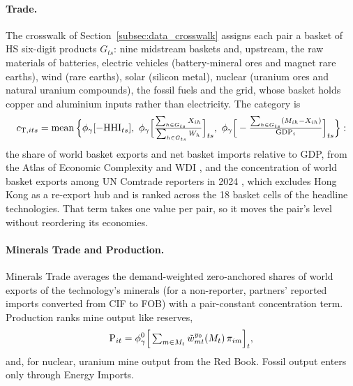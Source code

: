 \paragraph{Trade.}\label{subsec:es_trade} The crosswalk of Section~\ref{subsec:data_crosswalk}
assigns each pair a basket of HS six-digit products $G_{ts}$: nine midstream baskets and, upstream,
the raw materials of batteries, electric vehicles (battery-mineral ores and magnet rare earths), wind
(rare earths), solar (silicon metal), nuclear (uranium ores and natural uranium compounds), the
fossil fuels and the grid, whose basket holds copper and aluminium inputs rather than electricity.
The category is
\begin{equation}\label{eq:es_trade}
  c_{\mathrm{T},its}=\operatorname{mean}\Big\{\phi_{\gamma}[-\mathrm{HHI}_{ts}],\
  \phi_{\gamma}\Big[\tfrac{\sum_{h\in G_{ts}}X_{ih}}{\sum_{h\in G_{ts}}W_{h}}\Big]_{ts},\
  \phi_{\gamma}\Big[-\tfrac{\sum_{h\in G_{ts}}(M_{ih}-X_{ih})}{\mathrm{GDP}_i}\Big]_{ts}\Big\}:
\end{equation}
the share of world basket exports and net basket imports relative to GDP, from the Atlas of
Economic Complexity \citep{growthlab2019trade,hausmann2014atlas} and WDI \citep{worldbank2026wdi},
and the concentration of world basket exports among UN Comtrade reporters in 2024
\citep{uncomtrade}, which excludes Hong Kong as a re-export hub and is ranked across the 18 basket
cells of the headline technologies. That term takes one value per pair, so it moves the pair's
level without reordering its economies.

\paragraph{Minerals Trade and Production.}\label{subsec:es_minerals_trade}\label{subsec:es_production}
Minerals Trade averages the demand-weighted zero-anchored shares of world exports of the
technology's minerals (for a non-reporter, partners' reported imports converted from CIF to FOB)
with a pair-constant concentration term. Production ranks mine output like reserves,
\begin{equation}\label{eq:es_production}
  \mathrm{P}_{it}=\phi_{\gamma}^{0}\Big[\textstyle\sum_{m\in M_t}\tilde w^{y_0}_{mt}(M_t)\,\pi_{im}\Big]_{t},
\end{equation}
and, for nuclear, uranium mine output from the Red Book. Fossil output enters only through Energy
Imports.

